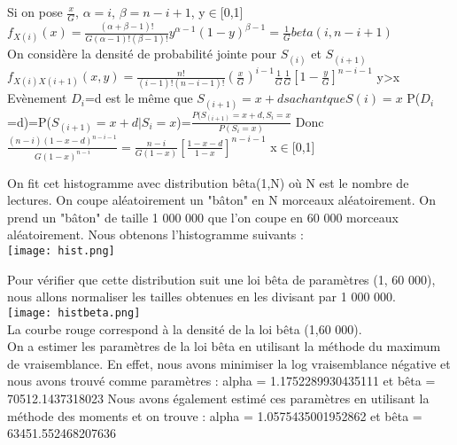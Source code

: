 \documentclass[12pt]{article}
\begin{document}
Si on pose $ \frac{x}{G}$, $\alpha=i$, $\beta=n-i+1$, y$\in$[0,1]                                                                                                                                                                                                                                                                                                                                                                                                                                                                                                                                                                                                                                                    \\ 
$f_{X(i)}(x)= \frac{(\alpha+\beta-1)!}{G(\alpha-1)!(\beta-1)!}y^{\alpha-1}(1-y)^{\beta-1}=\frac{1}{G}beta(i,n-i+1) $\\
On considère la densité de probabilité jointe pour $S_(i)$ et $S_{(i+1)}$\\
$f_{X(i)X(i+1)}(x,y) = \frac{n!}{(i-1)!(n-i-1)!} (\frac{x}{G})^{i-1} \frac{1}{G} \frac{1}{G}[1-\frac{y}{G}]^{n-i-1}$ y>x
Evènement $D_i$=d est le même que $S_{(i+1)}=x+d sachant que S(i)=x$
P($D_i$=d)=P($S_{(i+1)}=x+d|S_i=x $)=$\frac{P(S_{(i+1)}=x+d,S_i=x}{P(S_i=x)} $
Donc $\frac{(n-i)(1-x-d)^{n-i-1}}{G(1-x)^{n-i}}=\frac{n-i}{G(1-x)}[\frac{1-x-d}{1-x}]^{n-i-1}$ x$\in$[0,1]                                                                                                                                                                                                                                                                                                                                                                                                                                                                                                                                                                                                                                                   

On fit cet histogramme avec distribution bêta(1,N) où N est le nombre de lectures.
On coupe aléatoirement un "bâton" en N morceaux aléatoirement.
On prend un "bâton" de taille 1 000 000 que l'on coupe en 60 000 morceaux aléatoirement. Nous obtenons l'histogramme suivants : \\
\texttt{[image: hist.png]}

Pour vérifier que cette distribution suit une loi bêta de paramètres (1, 60 000), nous allons normaliser les tailles obtenues en les divisant par 1 000 000.\\
\texttt{[image: histbeta.png]}\\
La courbe rouge correspond à la densité de la loi bêta (1,60 000).\\
On a estimer les paramètres de la loi bêta en utilisant la méthode du maximum de vraisemblance. En effet, nous avons minimiser la log vraisemblance négative et nous avons trouvé comme paramètres : 
alpha = 1.1752289930435111 et bêta = 70512.1437318023
Nous avons également estimé ces paramètres en utilisant la méthode des moments et on trouve : 
alpha = 1.0575435001952862 et bêta = 63451.552468207636
\end{document}
